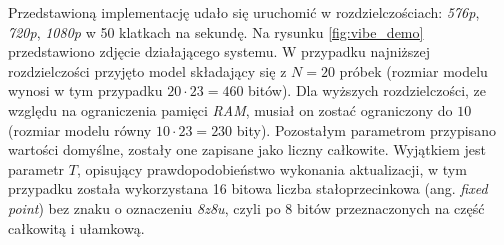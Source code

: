 Przedstawioną implementację udało się uruchomić w rozdzielczościach: \textit{576p}, \textit{720p}, \textit{1080p} w 50 klatkach na sekundę. 
Na rysunku \ref{fig:vibe_demo} przedstawiono zdjęcie działającego systemu. 
W przypadku najniższej rozdzielczości przyjęto model składający się z $N=20$ próbek (rozmiar modelu wynosi w tym przypadku $20 \cdot 23=460$ bitów). 
Dla wyższych rozdzielczości, ze względu na ograniczenia pamięci \textit{RAM}, musiał on zostać ograniczony do $10$ (rozmiar modelu równy $10 \cdot 23=230$ bity). 
Pozostałym parametrom przypisano wartości domyślne, zostały one zapisane jako liczny całkowite. 
Wyjątkiem jest parametr $T$, opisujący prawdopodobieństwo wykonania aktualizacji, w tym przypadku została wykorzystana 16 bitowa liczba stałoprzecinkowa (ang. \textit{fixed point}) bez znaku o oznaczeniu \textit{8z8u}, czyli po 8 bitów przeznaczonych na część całkowitą i ułamkową.

